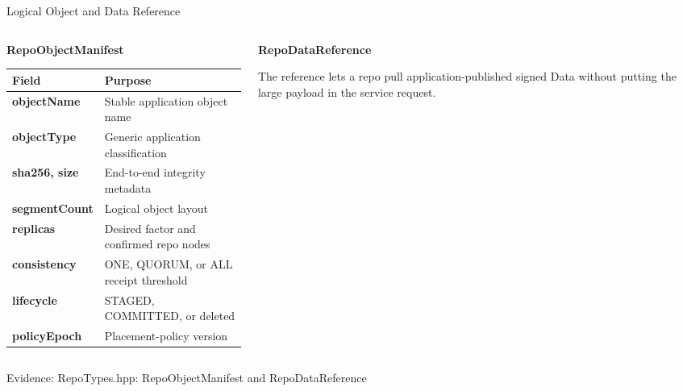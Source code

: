 \documentclass[aspectratio=169]{beamer}
\newcommand{\evidence}[1]{%
  \vfill\par\noindent
  {\color{SoftGray}\tiny Evidence: #1}\par
}
\begin{document}
\begin{frame}{Logical Object and Data Reference}
\footnotesize
\begin{columns}[T]
\begin{column}{0.55\textwidth}
\textbf{RepoObjectManifest}

\vspace{0.25em}
\begin{tabularx}{\linewidth}{@{}>{\bfseries}l X@{}}
\toprule
Field & Purpose \\
\midrule
objectName & Stable application object name \\
objectType & Generic application classification \\
sha256, size & End-to-end integrity metadata \\
segmentCount & Logical object layout \\
replicas & Desired factor and confirmed repo nodes \\
consistency & ONE, QUORUM, or ALL receipt threshold \\
lifecycle & STAGED, COMMITTED, or deleted \\
policyEpoch & Placement-policy version \\
\bottomrule
\end{tabularx}
\end{column}
\begin{column}{0.41\textwidth}
\textbf{RepoDataReference}

\vspace{0.25em}

\vspace{0.3em}
The reference lets a repo pull application-published signed Data without putting the large payload in the service request.
\end{column}
\end{columns}
\evidence{RepoTypes.hpp: RepoObjectManifest and RepoDataReference}
\end{frame}
\end{document}
